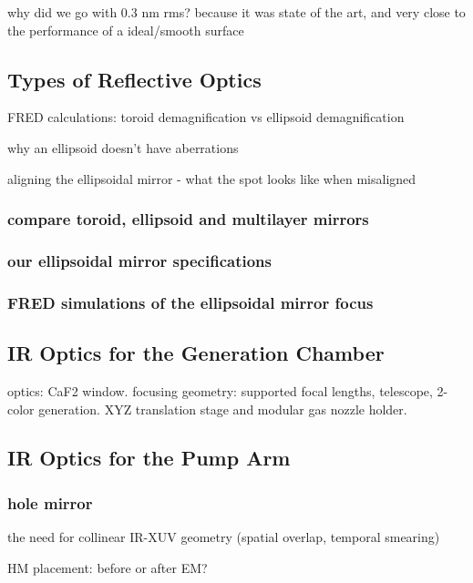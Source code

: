 why did we go with 0.3 nm rms? because it was state of the art, and very close to the performance of a ideal/smooth surface

\subsection{Types of Reflective Optics}

FRED calculations: toroid demagnification vs ellipsoid demagnification

why an ellipsoid doesn't have aberrations

aligning the ellipsoidal mirror - what the spot looks like when misaligned



\subsubsection{compare toroid, ellipsoid and multilayer mirrors}

\subsubsection{our ellipsoidal mirror specifications}

\subsubsection{FRED simulations of the ellipsoidal mirror focus}

\subsection{IR Optics for the Generation Chamber}

optics: CaF2 window. focusing geometry: supported focal lengths, telescope, 2-color generation. XYZ translation stage and modular gas nozzle holder.

\subsection{IR Optics for the Pump Arm}

\subsubsection{hole mirror}
the need for collinear IR-XUV geometry (spatial overlap, temporal smearing)

HM placement: before or after EM?

